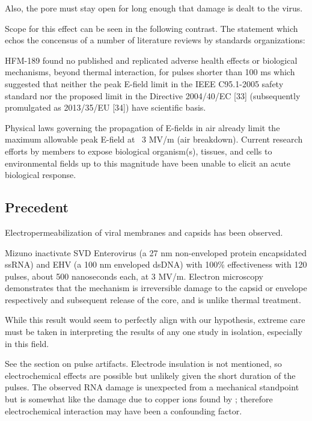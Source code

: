 \documentclass[paper.tex]{subfiles}
\begin{document}
\begin{multicols}{1}
Also, the pore must stay open for long enough that damage is dealt to the virus. 



Scope for this effect can be seen in the following contrast. The statement which echos the concensus of a number of literature reviews by standards organizations:

\begin{fquote}
	HFM-189 found no published and replicated adverse health effects or biological mechanisms, beyond
	thermal interaction, for pulses shorter than 100 ms which suggested that neither the peak E-field limit in the
	IEEE C95.1-2005 safety standard {} nor the proposed limit in the Directive 2004/40/EC [33] (subsequently promulgated as 2013/35/EU [34]) have scientific basis. 
	
	Physical laws governing the propagation of E-fields in air already limit the maximum allowable peak E-field at ~3 MV/m (air breakdown). Current research efforts by members to expose biological organism(s), tissues, and cells to environmental
	fields up to this magnitude have been unable to elicit an acute biological response.
\end{fquote}

\subsection{Precedent}

Electropermeabilization of viral membranes and capsids has been observed.

Mizuno \cite{Inactivation1990} inactivate SVD Enterovirus (a 27 nm non-enveloped protein encapsidated ssRNA) and EHV (a 100 nm enveloped dsDNA) with 100\% effectiveness with 120 pulses, about 500 nanoseconds each, at 3 MV/m. Electron microscopy demonstrates that the mechanism is irreversible damage to the capsid or envelope respectively and subsequent release of the core, and is unlike thermal treatment.

While this result would seem to perfectly align with our hypothesis, extreme care must be taken in interpreting the results of any one study in isolation, especially in this field. 

See the section on pulse artifacts. Electrode insulation is not mentioned, so electrochemical effects are possible but unlikely given the short duration of the pulses. The observed RNA damage is unexpected from a mechanical standpoint but is somewhat like the damage due to copper ions found by \cite{Microwave1987}; therefore electrochemical interaction may have been a confounding factor.


\end{multicols}
\end{document}
